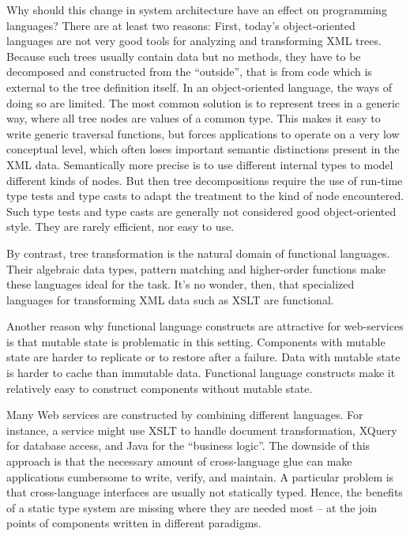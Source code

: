 Why should this change in system architecture have an effect on
programming languages? There are at least two reasons: First, today's
object-oriented languages are not very good tools for analyzing and
transforming XML trees. Because such trees usually contain data but no
methods, they have to be decomposed and constructed from the
``outside'', that is from code which is external to the tree
definition itself. In an object-oriented language, the ways of doing
so are limited. The most common solution \cite{dom} is to represent
trees in a generic way, where all tree nodes are values of a common
type.  This makes it easy to write generic traversal functions, but
forces applications to operate on a very low conceptual level, which
often loses important semantic distinctions present in the XML data.
Semantically more precise is to use different internal types to model
different kinds of nodes.  But then tree decompositions require the
use of run-time type tests and type casts to adapt the treatment to
the kind of node encountered. Such type tests and type casts are
generally not considered good object-oriented style. They are rarely
efficient, nor easy to use.  

By contrast, tree transformation is the natural domain of functional
languages. Their algebraic data types, pattern matching and
higher-order functions make these languages ideal for the task. It's
no wonder, then, that specialized languages for transforming XML data
such as XSLT are functional.

Another reason why functional language constructs are attractive for
web-services is that mutable state is problematic in this setting.
Components with mutable state are harder to replicate or to restore
after a failure. Data with mutable state is harder to cache than
immutable data. Functional language constructs make it relatively easy
to construct components without mutable state.

Many Web services are constructed by combining different languages.
For instance, a service might use XSLT to handle document
transformation, XQuery for database access, and Java for the
``business logic''.  The downside of this approach is that the
necessary amount of cross-language glue can make applications
cumbersome to write, verify, and maintain. A particular problem is
that cross-language interfaces are usually not statically typed.
Hence, the benefits of a static type system are missing where they are
needed most -- at the join points of components written in different
paradigms.  

